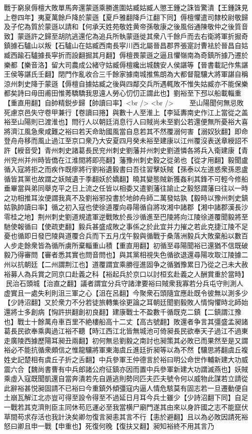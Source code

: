 戰于窮泉傉檀大敗單馬奔還蒙遜乘勝進圍姑臧姑臧人懲王鍾之誅皆驚潰【王鍾誅見上卷四年】夷夏萬餘戶降於蒙遜【夏戶雅翻降戶江翻下同】傉檀懼遣司隸校尉敬歸及子佗為質於蒙遜以請和【何承天姓苑敬姓黄帝孫敬康之後風俗通陳敬仲之後質音致】蒙遜許之歸至胡阬逃還佗為追兵所執蒙遜徙其衆八千餘戶而去右衛將軍折掘奇鎮據石驢山以叛【石驢山在姑臧西南長寜川西北屬晉昌郡界張寔討曹袪於晉昌自姑臧西踰石驢據長寜折而設翻掘其月翻】傉檀畏蒙遜之逼且懼嶺南為奇鎮所據乃遷於樂都【樂音洛】留大司農成公緒守姑臧傉檀纔出城魏安人侯諶等【晉書載記作焦諶王侯等諶氏壬翻】閉門作亂收合三千餘家據南城推焦朗為大都督龍驤大將軍諶自稱涼州刺史降于蒙遜【傉檀自據姑臧之後與四鄰交兵所遇輒敗不惟失姑臧亦不能保樂都矣詩曰毋田甫田惟莠驕驕我思遠人勞心忉忉正謂此也】劉裕至下邳以船載輜重【重直用翻】自帥精鋭步歸【帥讀曰率】<br />
<br />
　　至山陽聞何無忌敗死慮京邑失守卷甲兼行【卷讀曰捲】與數十人至淮上【李延夀南史作江上當從之盖裕至山陽則已渡淮也】問行人以朝廷消息行人曰賊尚未至劉公若還便無所憂裕大喜將濟江風急衆咸難之裕曰若天命助國風當自息若其不然覆溺何害【溺奴狄翻】即命登舟舟移而風止過江至京口衆乃大安夏四月癸未裕至建康以江州覆沒表送章綬詔不許【綬音受】青州刺史諸葛長民兖州刺史劉藩并州刺史劉道憐各將兵入衛建康【青州兖州并州時皆僑在江淮間將即亮翻】藩豫州刺史毅之從弟也【從才用翻】毅聞盧循入寇將拒之而疾作既瘳將行劉裕遺毅書曰吾往習擊妖賊【孫泰以左道惑衆孫恩盧循皆其黨也故謂之妖賊遺于季翻妖於嬌翻】曉其變態賊新獲姦利其鋒不可輕今修船垂畢當與弟同舉克平之日上流之任皆以相委又遣劉藩往諭止之毅怒謂藩曰往以一時之功相推耳汝便謂我真不及劉裕邪投書於地帥舟師二萬發姑孰【毅時以豫州刺史鎮姑孰帥讀曰率】循之初入寇也使徐道覆向尋陽循自將攻湘中諸郡【湘中諸郡漢長沙零桂之地】荆州刺史劉道規遣軍逆戰敗於長沙循進至巴陵將向江陵徐道覆聞毅將至馳使報循曰【使疏吏翻】毅兵甚盛成敗之事係之於此宜并力摧之若此克捷江陵不足憂也循即日發巴陵與道覆合兵而下五月戊午毅與循戰于桑落洲毅兵大敗棄船以數百人步走餘衆皆為循所虜所棄輜重山積【重直用翻】初循至尋陽聞裕已還猶不信既破毅乃得審問【審者悉其實也問音問也】與其黨相視失色循欲退還尋陽攻取江陵據二州以抗朝廷【二州謂荆江也】道覆謂宜乘勝徑進固争之循猶豫累日乃從之己未大赦裕募人為兵賞之同京口赴義之科【裕起兵於京口以討桓玄赴義之人酬賞重於當時】民治石頭城【治直之翻】議者謂宜分兵守諸津要裕曰賊衆我寡若分兵屯守則測人虚實且一處失利則沮三軍之心【沮在呂翻】今聚衆石頭隨宜應赴既令彼無以測多少【少詩沼翻】又於衆力不分若徒旅轉集徐更論之耳朝廷聞劉毅敗人情恟懼時北師始還將士多創病【恟許拱翻創初良翻】建康戰士不盈數千循既克二鎮【二鎮謂江豫也】戰士十餘萬舟車百里不絶樓船高十二丈【高古號翻】敗還者争言其彊盛孟昶諸葛長民欲奉乘輿過江裕不聽【時江西江北皆無城池可倚昶長民欲奉天子過江不過東走廣陵西據歷陽耳昶丑兩翻】初何無忌劉毅之南討也昶策其必敗已而果然至是又謂裕必不能抗循衆頗信之惟龍驤將軍東海虞丘進廷折昶等以為不然【驤思將翻虞丘複姓史記楚相有虞丘子折之舌翻】中兵參軍王仲德言於裕曰明公命世作輔新建大功威震六合【魏尚書曹有中兵郎諸公府征鎮亦因而置中兵參軍新建大功謂滅燕也】妖賊乘虛入寇既聞凱還自當奔潰若先自遁逃則勢同匹夫匹夫號令何以威物此謀若立請從此辭裕甚悦昶固請不已裕曰今重鎮外傾彊寇内逼人情危駭莫有固志若一旦遷動便自土崩瓦解江北亦豈可得至設令得至不過延日月耳今兵士雖少【少詩沼翻下同】自足一戰若其克濟則臣主同休苟厄運必至我當横尸廟門遂其由來以身許國之志不能竄伏草間苟求存活也我計決矣卿勿復言昶恚其言不行【恚於避翻】且以為必敗因請死裕怒曰卿且申一戰【申重也】死復何晚【復扶又翻】昶知裕終不用其言乃